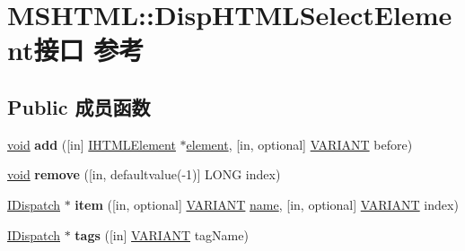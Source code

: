 \hypertarget{interface_m_s_h_t_m_l_1_1_disp_h_t_m_l_select_element}{}\section{M\+S\+H\+T\+ML\+:\+:Disp\+H\+T\+M\+L\+Select\+Element接口 参考}
\label{interface_m_s_h_t_m_l_1_1_disp_h_t_m_l_select_element}
\subsection*{Public 成员函数}
\begin{DoxyCompactItemize}
\item 
\mbox{\label{interface_m_s_h_t_m_l_1_1_disp_h_t_m_l_select_element_a6215eedb8e00ddfa94996865b0e37866}} 
\hyperlink{interfacevoid}{void} {\bfseries add} (\mbox{[}in\mbox{]} \hyperlink{interface_m_s_h_t_m_l_1_1_i_h_t_m_l_element}{I\+H\+T\+M\+L\+Element} $\ast$\hyperlink{structelement}{element}, \mbox{[}in, optional\mbox{]} \hyperlink{structtag_v_a_r_i_a_n_t}{V\+A\+R\+I\+A\+NT} before)
\item 
\mbox{\label{interface_m_s_h_t_m_l_1_1_disp_h_t_m_l_select_element_a001ec465c3f2384a5962369523e166c6}} 
\hyperlink{interfacevoid}{void} {\bfseries remove} (\mbox{[}in, defaultvalue(-\/1)\mbox{]} L\+O\+NG index)
\item 
\mbox{\label{interface_m_s_h_t_m_l_1_1_disp_h_t_m_l_select_element_abd1c40654725bce55897d54a113cb602}} 
\hyperlink{interface_i_dispatch}{I\+Dispatch} $\ast$ {\bfseries item} (\mbox{[}in, optional\mbox{]} \hyperlink{structtag_v_a_r_i_a_n_t}{V\+A\+R\+I\+A\+NT} \hyperlink{structname}{name}, \mbox{[}in, optional\mbox{]} \hyperlink{structtag_v_a_r_i_a_n_t}{V\+A\+R\+I\+A\+NT} index)
\item 
\mbox{\label{interface_m_s_h_t_m_l_1_1_disp_h_t_m_l_select_element_a98d97d2ff60a589645c3de465d00e3b1}} 
\hyperlink{interface_i_dispatch}{I\+Dispatch} $\ast$ {\bfseries tags} (\mbox{[}in\mbox{]} \hyperlink{structtag_v_a_r_i_a_n_t}{V\+A\+R\+I\+A\+NT} tag\+Name)
\item 

\end{DoxyCompactItemize}
